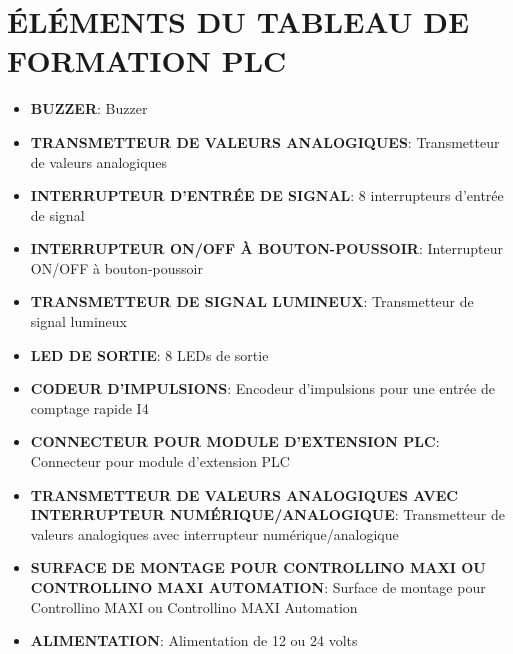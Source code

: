\documentclass[a4paper,12pt]{report}
\begin{document}
\section*{ÉLÉMENTS DU TABLEAU DE FORMATION PLC}

\begin{itemize}
    \item \textbf{BUZZER}:
    Buzzer\\
    
    \item \textbf{TRANSMETTEUR DE VALEURS ANALOGIQUES}:
    Transmetteur de valeurs analogiques\\
    
    \item \textbf{INTERRUPTEUR D'ENTRÉE DE SIGNAL}:
    8 interrupteurs d'entrée de signal\\
    
    \item \textbf{INTERRUPTEUR ON/OFF À BOUTON-POUSSOIR}:
    Interrupteur ON/OFF à bouton-poussoir\\
    
    \item \textbf{TRANSMETTEUR DE SIGNAL LUMINEUX}:
    Transmetteur de signal lumineux\\
    
    \item \textbf{LED DE SORTIE}:
    8 LEDs de sortie\\
    
    \item \textbf{CODEUR D'IMPULSIONS}:
    Encodeur d'impulsions pour une entrée de comptage rapide I4\\
    
    \item \textbf{CONNECTEUR POUR MODULE D'EXTENSION PLC}:
    Connecteur pour module d'extension PLC\\
    
    \item \textbf{TRANSMETTEUR DE VALEURS ANALOGIQUES AVEC INTERRUPTEUR NUMÉRIQUE/ANALOGIQUE}:
    Transmetteur de valeurs analogiques avec interrupteur numérique/analogique\\
    
    \item \textbf{SURFACE DE MONTAGE POUR CONTROLLINO MAXI OU CONTROLLINO MAXI AUTOMATION}:
    Surface de montage pour Controllino MAXI ou Controllino MAXI Automation\\
    
    \item \textbf{ALIMENTATION}:
    Alimentation de 12 ou 24 volts\\
    

\end{itemize}
\end{document}
